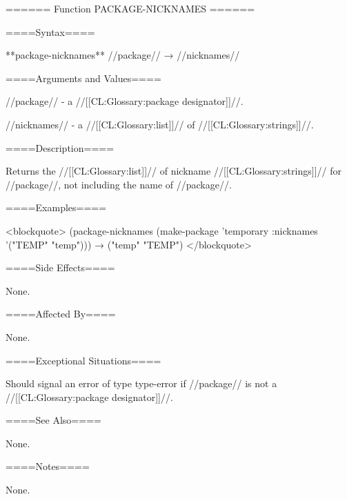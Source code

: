 ====== Function PACKAGE-NICKNAMES ======

====Syntax====

**package-nicknames** //package// → //nicknames//

====Arguments and Values====

//package// - a //[[CL:Glossary:package designator]]//.

//nicknames// - a //[[CL:Glossary:list]]// of //[[CL:Glossary:strings]]//.

====Description====

Returns the //[[CL:Glossary:list]]// of nickname //[[CL:Glossary:strings]]// for //package//, not including the name of //package//.

====Examples====

<blockquote> (package-nicknames (make-package 'temporary :nicknames '("TEMP" "temp"))) → ("temp" "TEMP") </blockquote>

====Side Effects====

None.

====Affected By====

None.

====Exceptional Situations====

Should signal an error of type type-error if //package// is not a //[[CL:Glossary:package designator]]//.

====See Also====

None.

====Notes====

None.

